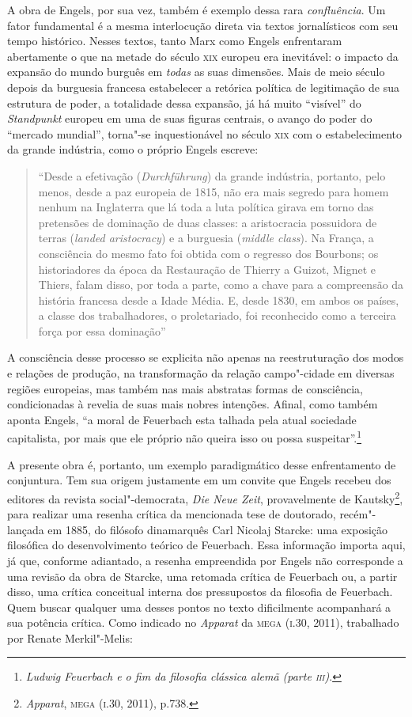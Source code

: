 A obra de Engels, por sua vez, também é exemplo dessa rara
\emph{confluência}. Um fator fundamental é a mesma interlocução direta
via textos jornalísticos com seu tempo histórico. Nesses textos, tanto
Marx como Engels enfrentaram abertamente o que na metade do século
\textsc{xix} europeu era inevitável: o impacto da expansão do mundo
burguês em \emph{todas} as suas dimensões. Mais de meio século depois da
burguesia francesa estabelecer a retórica política de legitimação de sua
estrutura de poder, a totalidade dessa expansão, já há muito ``visível''
do \emph{Standpunkt} europeu em uma de suas figuras centrais, o avanço
do poder do ``mercado mundial'', torna"-se inquestionável no século
\textsc{xix} com o estabelecimento da grande indústria, como o próprio
Engels escreve:

\begin{quote}
``Desde a efetivação (\emph{Durchführung}) da grande indústria,
portanto, pelo menos, desde a paz europeia de 1815, não era mais segredo
para homem nenhum na Inglaterra que lá toda a luta política girava em
torno das pretensões de dominação de duas classes: a aristocracia
possuidora de terras (\emph{landed aristocracy}) e a burguesia
(\emph{middle class}). Na França, a consciência do mesmo fato foi obtida
com o regresso dos Bourbons; os historiadores da época da Restauração de
Thierry a Guizot, Mignet e Thiers, falam disso, por toda a parte, como a
chave para a compreensão da história francesa desde a Idade Média. E,
desde 1830, em ambos os países, a classe dos trabalhadores, o
proletariado, foi reconhecido como a terceira força por essa dominação''
\end{quote}

A consciência desse processo se explicita não apenas na reestruturação
dos modos e relações de produção, na transformação da relação
campo"-cidade em diversas regiões europeias, mas também nas mais
abstratas formas de consciência, condicionadas à revelia de suas mais
nobres intenções. Afinal, como também aponta Engels, ``a moral de
Feuerbach esta talhada pela atual sociedade capitalista, por mais que
ele próprio não queira isso ou possa suspeitar''.\footnote{\emph{Ludwig
  Feuerbach e o fim da filosofia clássica alemã (parte \textsc{iii})}.}

A presente obra é, portanto, um exemplo paradigmático desse
enfrentamento de conjuntura. Tem sua origem justamente em um convite que
Engels recebeu dos editores da revista social"-democrata, \emph{Die
Neue Zeit}, provavelmente de Kautsky\footnote{\emph{Apparat},
  \textsc{mega} (\textsc{i}.30, 2011), p.738.}, para realizar uma
resenha crítica da mencionada tese de doutorado, recém"-lançada em
1885, do filósofo dinamarquês Carl Nicolaj Starcke: uma exposição
filosófica do desenvolvimento teórico de Feuerbach. Essa informação
importa aqui, já que, conforme adiantado, a resenha empreendida por
Engels não corresponde a uma revisão da obra de Starcke, uma retomada
crítica de Feuerbach ou, a partir disso, uma crítica conceitual interna
dos pressupostos da filosofia de Feuerbach. Quem buscar qualquer uma
desses pontos no texto dificilmente acompanhará a sua potência crítica.
Como indicado no \emph{Apparat} da \textsc{mega} (\textsc{i}.30, 2011),
trabalhado por Renate Merkil"-Melis:

